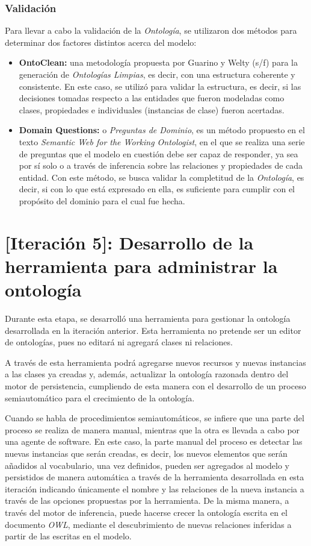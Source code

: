 \begin{itemize}
\subsubsection{Validación}
Para llevar a cabo la validación de la \textit{Ontología}, se utilizaron dos métodos para determinar dos factores distintos acerca del modelo: 

\begin{itemize}
    \item \textbf{OntoClean:} una metodología propuesta por Guarino y Welty (s/f) para la generación de \textit{Ontologías Limpias}, es decir, con una estructura coherente y consistente. En este caso, se utilizó para validar la estructura, es decir, si las decisiones tomadas respecto a las entidades que fueron modeladas como clases, propiedades e individuales (instancias de clase) fueron acertadas.
    \item \textbf{Domain Questions:} o \textit{Preguntas de Dominio}, es un método propuesto en el texto \textit{Semantic Web for the Working Ontologist}, en el que se realiza una serie de preguntas que el modelo en cuestión debe ser capaz de responder, ya sea por sí solo o a través de inferencia sobre las relaciones y propiedades de cada entidad. Con este método, se busca validar la completitud de la \textit{Ontología}, es decir, si con lo que está expresado en ella, es suficiente para cumplir con el propósito del dominio para el cual fue hecha.
\end{itemize}

\section{[Iteración 5]: Desarrollo de la herramienta para administrar la ontología}
Durante esta etapa, se desarrolló una herramienta para gestionar la ontología desarrollada en la iteración anterior. Esta herramienta no pretende ser un editor de ontologías, pues no editará ni agregará clases ni relaciones.

A través de esta herramienta podrá agregarse nuevos recursos y nuevas instancias a las clases ya creadas y, además, actualizar la ontología razonada dentro del motor de persistencia, cumpliendo de esta manera con el desarrollo de un proceso semiautomático para el crecimiento de la ontología.

Cuando se habla de procedimientos semiautomáticos, se infiere que una parte del proceso se realiza de manera manual, mientras que la otra es llevada a cabo por una agente de software. En este caso, la parte manual del proceso es detectar las nuevas instancias que serán creadas, es decir, los nuevos elementos que serán añadidos al vocabulario, una vez definidos, pueden ser agregados al modelo y persistidos de manera automática a través de la herramienta desarrollada en esta iteración indicando únicamente el nombre y las relaciones de la nueva instancia a través de las opciones propuestas por la herramienta. De la misma manera, a través del motor de inferencia, puede hacerse crecer la ontología escrita en el documento \textit{OWL}, mediante el descubrimiento de nuevas relaciones inferidas a partir de las escritas en el modelo.


\end{itemize}

